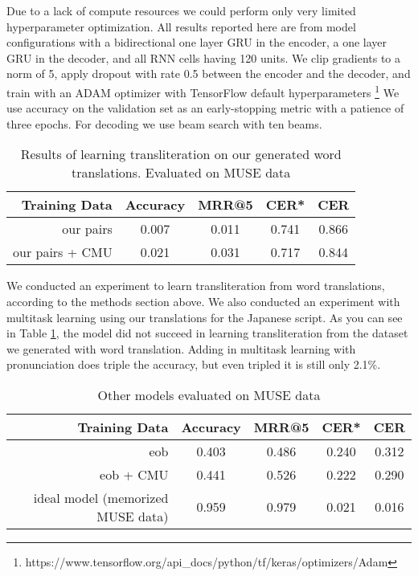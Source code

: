 \documentclass{article}
\begin{document}
Due to a lack of compute resources we could perform
only very limited hyperparameter optimization.
All results reported here are from model configurations
with a bidirectional one layer GRU in the encoder,
a one layer GRU in the decoder,
and all RNN cells having 120 units.
We clip gradients to a norm of 5,
apply dropout with rate 0.5 between the encoder and the decoder,
and train with an ADAM optimizer with TensorFlow default hyperparameters
\footnote{https://www.tensorflow.org/api\_docs/python/tf/keras/optimizers/Adam}
We use accuracy on the validation set as an early-stopping metric
with a patience of three epochs.
For decoding we use beam search with ten beams.

\begin{table}[h]
  \centering
  \begin{tabular}{r | c c c c}
    Training Data & Accuracy & MRR@5 & CER* & CER \\
    \hline
    our pairs & 0.007 & 0.011 & 0.741 & 0.866 \\
    our pairs + CMU & 0.021 & 0.031 & 0.717 & 0.844 \\
  \end{tabular}
  \caption{Results of learning transliteration on our generated word
    translations. Evaluated on MUSE data}
  \label{tab:our-muse}
\end{table}

We conducted an experiment to learn transliteration from word translations,
according to the methods section above.
We also conducted an experiment with multitask learning
using our translations for the Japanese script.
As you can see in Table \ref{tab:our-muse},
the model did not succeed in learning transliteration
from the dataset we generated with word translation.
Adding in multitask learning with pronunciation does triple the accuracy,
but even tripled it is still only 2.1\%.

\begin{table}[h]
  \centering
  \begin{tabular}{r | c c c c}
    Training Data & Accuracy & MRR@5 & CER* & CER \\
    \hline
    eob & 0.403 & 0.486 & 0.240 & 0.312 \\
    eob + CMU & 0.441 & 0.526 & 0.222 & 0.290 \\
    \hline
    ideal model (memorized MUSE data) & 0.959 & 0.979 & 0.021 & 0.016\\
  \end{tabular}
  \caption{Other models evaluated on MUSE data}
  \label{tab:other-muse}
\end{table}
\end{document}
